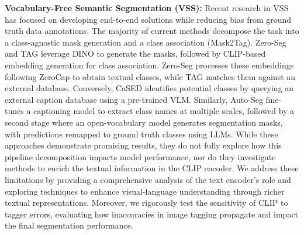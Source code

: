 \textbf{Vocabulary-Free Semantic Segmentation (VSS):} Recent research in VSS has focused on developing end-to-end solutions while reducing bias from  ground truth data annotations. The majority of current methods decompose the task into a class-agnostic mask generation and a class association (Mask2Tag). Zero-Seg \cite{rewatbowornwong2023zero} and TAG \cite{kawano2024tag} leverage DINO \cite{caron2021emerging} to generate the masks, followed by CLIP-based \cite{radford2021learning} embedding generation for class association. Zero-Seg processes these embeddings %
following ZeroCap \cite{tewel2021zero} to obtain textual classes, while TAG matches them against an external database. 
Conversely, CaSED \cite{conti2024vocabulary} identifies potential classes by querying an external caption database using a pre-trained VLM. %
Similarly, Auto-Seg \cite{ulger2024autovocabularysemanticsegmentation} %
fine-tunes a captioning model to extract class names at multiple scales, followed by a second stage where an open-vocabulary model generates segmentation masks, with predictions remapped to ground truth classes using LLMs. While these approaches demonstrate promising results, they do not fully explore how this pipeline decomposition impacts model performance, nor do they investigate methods to enrich the textual information in the CLIP encoder. We address these limitations by providing a comprehensive analysis of the text encoder's role and exploring techniques to enhance visual-language understanding through richer textual representations. Moreover, we rigorously test the sensitivity of CLIP to tagger errors, evaluating how inaccuracies in image tagging propagate and impact the final segmentation performance.
